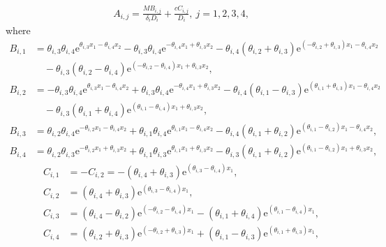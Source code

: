 \documentclass[11pt,reqno]{article}%
\numberwithin{equation}{section}
\begin{document}
\begin{equation}\nonumber
\begin{aligned}
 A_{i,j}  =\frac{MB_{i,j}}{\delta_i D_i}+\frac{cC_{i,j}}{D_i},\ j=1,2,3,4,\end{aligned}
\end{equation}
where
\begin{equation}\nonumber\begin{aligned}
B_{i,1} &=\theta_{i,3}\theta_{i,4} \mathrm{e}^{\theta_{i,3} x_1 - \theta_{i,4} x_2} - \theta_{i,3}\theta_{i,4} \mathrm{e}^{-\theta_{i,4} x_1 + \theta_{i,3} x_2}-\theta_{i,4}(\theta_{i,2} +\theta_{i,3}) \mathrm{e}^{(-\theta_{i,2} + \theta_{i,3}) x_1- \theta_{i,4} x_2} \\&\quad- \theta_{i,3}(\theta_{i,2} - \theta_{i,4})  \mathrm{e}^{(-\theta_{i,2} - \theta_{i,4}) x_1 + \theta_{i,3} x_2},\\
B_{i,2} &=-\theta_{i,3}\theta_{i,4} \mathrm{e}^{\theta_{i,3} x_1 - \theta_{i,4} x_2} + \theta_{i,3}\theta_{i,4} \mathrm{e}^{-\theta_{i,4} x_1 + \theta_{i,3} x_2}-\theta_{i,4}(\theta_{i,1} -\theta_{i,3}) \mathrm{e}^{(\theta_{i,1} + \theta_{i,3}) x_1- \theta_{i,4} x_2} \\&\quad- \theta_{i,3}(\theta_{i,1} + \theta_{i,4})  \mathrm{e}^{(\theta_{i,1} - \theta_{i,4}) x_1 + \theta_{i,3} x_2},\\
B_{i,3} &=\theta_{i,2}\theta_{i,4} \mathrm{e}^{-\theta_{i,2} x_1 - \theta_{i,4} x_2} + \theta_{i,1}\theta_{i,4} \mathrm{e}^{\theta_{i,1} x_1- \theta_{i,4} x_2}-\theta_{i,4}(\theta_{i,1} +\theta_{i,2}) \mathrm{e}^{(\theta_{i,1} - \theta_{i,2}) x_1- \theta_{i,4} x_2} ,\\
B_{i,4} &=\theta_{i,2}\theta_{i,3} \mathrm{e}^{-\theta_{i,2} x_1 + \theta_{i,3} x_2} + \theta_{i,1}\theta_{i,3} \mathrm{e}^{\theta_{i,1} x_1+\theta_{i,3} x_2}-\theta_{i,3}(\theta_{i,1} +\theta_{i,2}) \mathrm{e}^{(\theta_{i,1} - \theta_{i,2}) x_1+ \theta_{i,3} x_2} ,
\end{aligned}
\end{equation}
\begin{equation}\nonumber\begin{aligned}
C_{i,1} &= -C_{i,2} =-(\theta_{i,4}+\theta_{i,3})\mathrm{e}^{(\theta_{i,3}-\theta_{i,4})x_1},\\
C_{i,2} &=(\theta_{i,4}+\theta_{i,3})\mathrm{e}^{(\theta_{i,3}-\theta_{i,4})x_1},\\
C_{i,3} &=(\theta_{i,4}-\theta_{i,2})\mathrm{e}^{(-\theta_{i,2}-\theta_{i,4})x_1}-(\theta_{i,1}+\theta_{i,4})\mathrm{e}^{(\theta_{i,1}-\theta_{i,4})x_1},\\
C_{i,4} &=(\theta_{i,2}+\theta_{i,3})\mathrm{e}^{(-\theta_{i,2}+\theta_{i,3})x_1}+(\theta_{i,1}-\theta_{i,3})\mathrm{e}^{(\theta_{i,1}+\theta_{i,3})x_1},
\end{aligned}
\end{equation}
\end{document}
